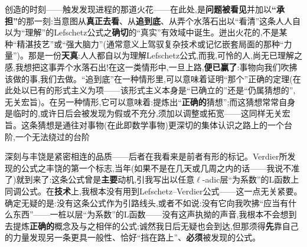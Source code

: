 创造的时刻——触发发现进程的那道火花——在此处,是\textbf{问题被看见}并加以\textbf{“承担”}的那一刻:当意图从\textbf{真正去看}、从\textbf{追到底}、从弄个水落石出以“看清”这条人人自以为“理解”的Lefschetz公式之\textbf{确切}的“真实”有效域中诞生。迸出火花的,不是某种“精湛技艺”或“强大脑力”(通常意义上驾驭复杂技术或记忆嵌套局面的那种“力量”)。那是一份\textbf{天真}:人人都自以为理解Lefschetz公式,而我,可怜的人,尚无已理解之感,我想把这事弄个水落石出!在这一类情形中,一旦上路,\textbf{便已赢了}:事物向我们吹拂该做的事,我们去做。“追到底”在一种情形里,可以意味着证明“那个”正确的定理(在此处以已有的形式主义为项——该形式主义本身是“已确立的”还是“仍属猜想的”,无关宏旨)。在另一种情形,它可以\dmark{}意味着:提炼出“\textbf{正确的}猜想”;而这猜想常常自身是临时的,或许日后会被发现为假或不充分,须加以调整或拓宽——这同样无关宏旨。这条猜想是通往对事物(在此即数学事物)更深切的集体认识之路上的一个台阶,一个无法绕过的台阶

深刻与丰饶是紧密相连的品质——后者在我看来是前者有形的标记。Verdier所发现的公式之丰饶的第一个标志,当年(如果不是在几天或几周之内的话——我说不准了)就到来了:这条公式曾是\textbf{主要}动机,引我写出以任意$\ell$-adic层“为系数”的L函数上同调公式。在\textbf{技术}上,我根本没有用到Lefschetz--Verdier公式——这一点无关紧要。确定无疑的是:没有这条公式作为引路线头,或者不如说:没有它向我吹拂“应当有什么东西”——一桩以层“为系数”的L函数——没有这声执拗的声音,我根本不会想到去提炼\textbf{正确的}概念及与之相伴的公式;诚然我日后无疑也会到达,但那须得\textbf{先}靠自己的力量发现另一条更具一般性、恰好“挡在路上”、\textbf{必须}被发现的公式。

